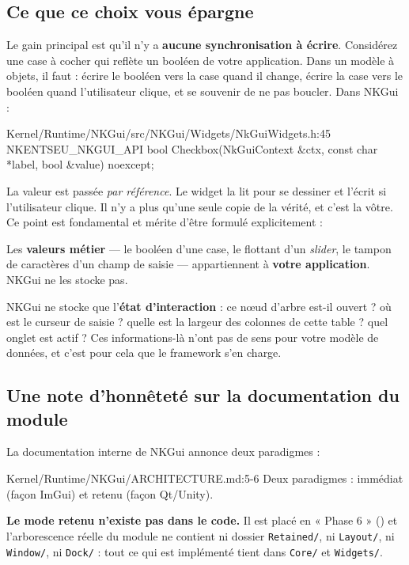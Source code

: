 \subsection{Ce que ce choix vous épargne}

Le gain principal est qu'il n'y a \textbf{aucune synchronisation à écrire}.
Considérez une case à cocher qui reflète un booléen de votre application. Dans
un modèle à objets, il faut : écrire le booléen vers la case quand il change,
écrire la case vers le booléen quand l'utilisateur clique, et se souvenir de ne
pas boucler. Dans NKGui :

\begin{nkcode}{Kernel/Runtime/NKGui/src/NKGui/Widgets/NkGuiWidgets.h:45}
NKENTSEU_NKGUI_API bool Checkbox(NkGuiContext &ctx, const char *label, bool &value) noexcept;
\end{nkcode}

La valeur est passée \emph{par référence}. Le widget la lit pour se dessiner et
l'écrit si l'utilisateur clique. Il n'y a plus qu'une seule copie de la vérité,
et c'est la vôtre. Ce point est fondamental et mérite d'être formulé
explicitement :

\begin{nkretenir}
Les \textbf{valeurs métier} — le booléen d'une case, le flottant d'un
\emph{slider}, le tampon de caractères d'un champ de saisie — appartiennent à
\textbf{votre application}. NKGui ne les stocke pas.

NKGui ne stocke que l'\textbf{état d'interaction} : ce nœud d'arbre est-il
ouvert ? où est le curseur de saisie ? quelle est la largeur des colonnes de
cette table ? quel onglet est actif ? Ces informations-là n'ont pas de sens pour
votre modèle de données, et c'est pour cela que le framework s'en charge.
\end{nkretenir}

\subsection{Une note d'honnêteté sur la documentation du module}

La documentation interne de NKGui annonce deux paradigmes :

\begin{nkcode}{Kernel/Runtime/NKGui/ARCHITECTURE.md:5-6}
Deux paradigmes : immédiat (façon ImGui) et retenu (façon Qt/Unity).
\end{nkcode}

\textbf{Le mode retenu n'existe pas dans le code.} Il est placé en « Phase 6 »
() et l'arborescence réelle du module ne contient ni
dossier \texttt{Retained/}, ni \texttt{Layout/}, ni \texttt{Window/}, ni
\texttt{Dock/} : tout ce qui est implémenté tient dans \texttt{Core/} et
\texttt{Widgets/}.

